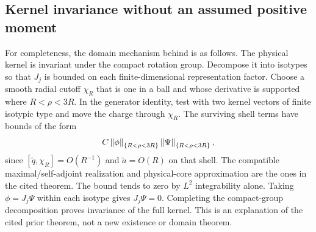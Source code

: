 \subsection{Kernel invariance without an assumed positive moment}
For completeness, the domain mechanism behind \cite[Theorem 1(a)]{HHI} is as follows. The physical kernel is invariant under the compact rotation group. Decompose it into isotypes so that $J_j$ is bounded on each finite-dimensional representation factor. Choose a smooth radial cutoff $\chi_R$ that is one in a ball and whose derivative is supported where $R<\rho<3R$. In the generator identity, test with two kernel vectors of finite isotypic type and move the charge through $\chi_R$. The surviving shell terms have bounds of the form
\begin{equation}
 C\left\lVert \phi\right\rVert_{\{R<\rho<3R\}}
  \left\lVert \Psi\right\rVert_{\{R<\rho<3R\}},
\end{equation}
since $[\widetilde q,\chi_R]=O(R^{-1})$ and $\widetilde a=O(R)$ on that shell. The compatible maximal/self-adjoint realization and physical-core approximation are the ones in the cited theorem. The bound tends to zero by $L^2$ integrability alone. Taking $\phi=J_j\Psi$ within each isotype gives $J_j\Psi=0$. Completing the compact-group decomposition proves invariance of the full kernel. This is an explanation of the cited prior theorem, not a new existence or domain theorem.
